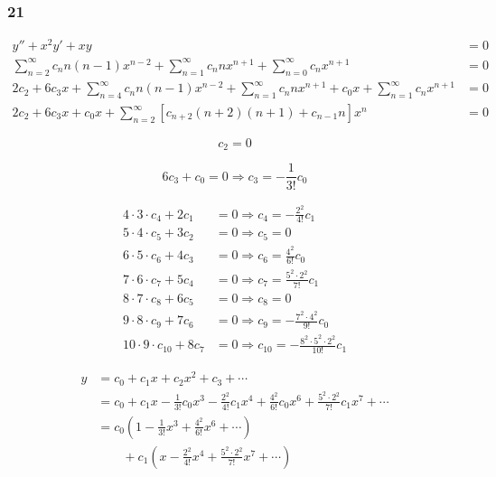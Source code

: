 \documentclass{article}
\begin{document}
\subsubsection{21}

\begin{align*}
  y'' + x^2 y' + x y                                                                                                                              & = 0 \\
  \sum_{n = 2}^\infty c_n n (n - 1) x^{n - 2} + \sum_{n = 1}^\infty c_n n x^{n + 1} + \sum_{n = 0}^\infty c_n x^{n + 1}                           & = 0 \\
  2 c_2 + 6 c_3 x + \sum_{n = 4}^\infty c_n n (n - 1) x^{n - 2} + \sum_{n = 1}^\infty c_n n x^{n + 1} + c_0 x + \sum_{n = 1}^\infty c_n x^{n + 1} & = 0 \\
  2 c_2 + 6 c_3 x + c_0 x + \sum_{n = 2}^\infty [c_{n + 2} (n + 2) (n + 1) + c_{n - 1} n] x^n                                                     & = 0
\end{align*}

\[c_2 = 0\]

\[6 c_3 + c_0 = 0 \Rightarrow c_3 = -\frac{1}{3!} c_0\]

\begin{align*}
  4 \cdot 3 \cdot c_4 + 2 c_1     & = 0 \Rightarrow c_4 = -\frac{2^2}{4!} c_1                         \\
  5 \cdot 4 \cdot c_5 + 3 c_2     & = 0 \Rightarrow c_5 = 0                                           \\
  6 \cdot 5 \cdot c_6 + 4 c_3     & = 0 \Rightarrow c_6 = \frac{4^2}{6!} c_0                          \\
  7 \cdot 6 \cdot c_7 + 5 c_4     & = 0 \Rightarrow c_7 = \frac{5^2 \cdot 2^2}{7!} c_1                \\
  8 \cdot 7 \cdot c_8 + 6 c_5     & = 0 \Rightarrow c_8 = 0                                           \\
  9 \cdot 8 \cdot c_9 + 7 c_6     & = 0 \Rightarrow c_9 = -\frac{7^2 \cdot 4^2}{9!} c_0               \\
  10 \cdot 9 \cdot c_{10} + 8 c_7 & = 0 \Rightarrow c_{10} = -\frac{8^2 \cdot 5^2 \cdot 2^2}{10!} c_1
\end{align*}

\begin{align*}
  y & = c_0 + c_1 x + c_2 x^2 + c_3 + \cdots                                                                                             \\
    & = c_0 + c_1 x - \frac{1}{3!} c_0 x^3 - \frac{2^2}{4!} c_1 x^4 + \frac{4^2}{6!} c_0 x^6 + \frac{5^2 \cdot 2^2}{7!} c_1 x^7 + \cdots \\
    & = c_0 \left( 1 - \frac{1}{3!} x^3 + \frac{4^2}{6!} x^6 + \cdots \right)                                                            \\
    & \qquad + c_1 \left( x - \frac{2^2}{4!} x^4 + \frac{5^2 \cdot 2^2}{7!} x^7 + \cdots \right)
\end{align*}
\end{document}
